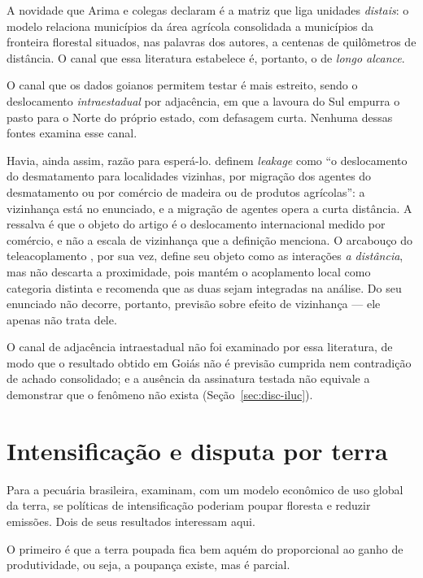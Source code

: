 A novidade que Arima e colegas declaram é a matriz que liga unidades
\emph{distais}: o modelo relaciona municípios da área agrícola consolidada a
municípios da fronteira florestal situados, nas palavras dos autores, a
centenas de quilômetros de distância. O canal que essa literatura estabelece
é, portanto, o de \emph{longo alcance}.

O canal que os dados goianos permitem testar é mais estreito, sendo o
deslocamento \emph{intraestadual} por adjacência, em que a lavoura do Sul
empurra o pasto para o Norte do próprio estado, com defasagem curta. Nenhuma
dessas fontes examina esse canal.

Havia, ainda assim, razão para esperá-lo.
 definem \emph{leakage}
como ``o deslocamento do desmatamento para localidades vizinhas, por migração
dos agentes do desmatamento ou por comércio de madeira ou de produtos
agrícolas'': a vizinhança está no enunciado, e a migração de agentes opera a
curta distância. A ressalva é que o objeto do artigo é o deslocamento
internacional medido por comércio, e não a escala de vizinhança que a
definição menciona. O arcabouço do teleacoplamento \cite{Liu2013}, por sua
vez, define seu objeto como as interações \emph{a distância}, mas não descarta
a proximidade, pois mantém o acoplamento local como categoria distinta e recomenda
que as duas sejam integradas na análise. Do seu enunciado não decorre,
portanto, previsão sobre efeito de vizinhança --- ele apenas não trata dele.

O canal de adjacência intraestadual não foi examinado por essa literatura, de
modo que o resultado obtido em Goiás não é previsão cumprida nem contradição
de achado consolidado; e a ausência da assinatura testada
não equivale a demonstrar que o fenômeno não exista
(Seção~\ref{sec:disc-iluc}).

\section{Intensificação e disputa por terra}
\label{sec:ref-intensificacao}

Para a pecuária brasileira,  examinam, com um modelo
econômico de uso global da terra, se políticas de intensificação poderiam
poupar floresta e reduzir emissões. Dois de seus resultados interessam aqui.

O primeiro é que a terra poupada fica bem aquém do proporcional ao ganho de
produtividade, ou seja, a poupança existe, mas é parcial.

